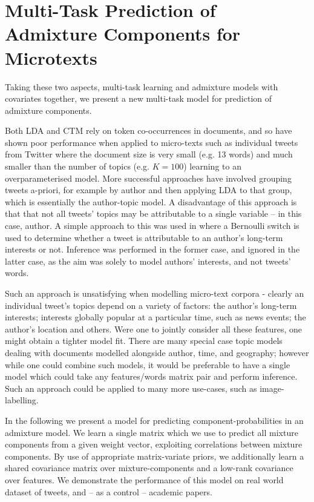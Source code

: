 

\section{Multi-Task Prediction of Admixture Components for Microtexts}
Taking these two aspects, multi-task learning and admixture models with covariates together, we present a new multi-task model for prediction of admixture components.

Both LDA and CTM rely on token co-occurrences in documents, and so have shown poor performance when applied to micro-texts such as individual tweets from Twitter\cite{DeLaRosa2011} where the document size is very small (e.g. 13 words) and much smaller than the number of topics (e.g. $K=100$) learning to an overparameterised model. More successful approaches have involved grouping tweets a-priori, for example by author\cite{Weng2010}\cite{Xu2011}\cite{Hong2010}\cite{Eisenstein2010} and then applying LDA to that group, which is essentially the author-topic model\cite{MacCallum2007}. A disadvantage of this approach is that that not all tweets' topics may be attributable to a single variable -- in this case, author. A simple approach to this was used in \cite{Xu2011} where a Bernoulli switch is used to determine whether a tweet is attributable to an author's long-term interests or not. Inference was performed in the former case, and ignored in the latter case, as the aim was solely to model authors' interests, and not tweets' words.

Such an approach is unsatisfying when modelling micro-text corpora - clearly an individual tweet's topics depend on a variety of factors: the author's long-term interests; interests globally popular at a particular time, such as news events; the author's location and others. Were one to jointly consider all these features, one might obtain a tighter model fit. There are many special case topic models dealing with documents modelled alongside author\cite{RosenZvi2004}, time\cite{Wang2006}, and geography\cite{Eisenstein2010}; however while one could combine such models, it would be preferable to have a single model which could take any features/words matrix pair and perform inference. Such an approach could be applied to many more use-cases, such as image-labelling.

In the following we present a model for predicting component-probabilities in an admixture model. We learn a single matrix which we use to predict all mixture components from a given weight vector, exploiting correlations between mixture components. By use of appropriate matrix-variate priors, we additionally learn a shared covariance matrix over mixture-components and a low-rank covariance over features. We demonstrate the performance of this model on real world dataset of tweets, and -- as a control -- academic papers.


